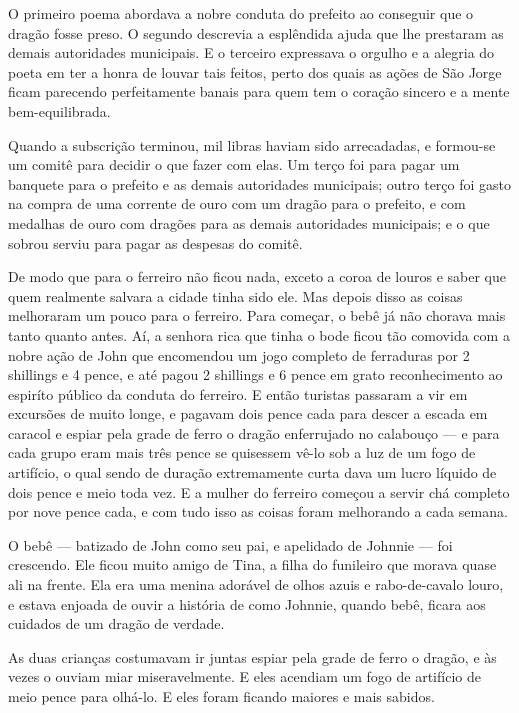 O primeiro poema abordava a nobre conduta do prefeito ao conseguir que
o dragão fosse preso. O segundo descrevia a esplêndida ajuda que lhe
prestaram as demais autoridades municipais. E o terceiro expressava o
orgulho e a alegria do poeta em ter a honra de louvar tais feitos,
perto dos quais as ações de São Jorge ficam parecendo perfeitamente
banais para quem tem o coração sincero e a mente bem-equilibrada.

Quando a subscrição terminou, mil libras haviam sido arrecadadas, e
formou-se um comitê para decidir o que fazer com elas. Um terço foi
para pagar um banquete para o prefeito e as demais autoridades
municipais; outro terço foi gasto na compra de uma corrente de ouro
com um dragão para o prefeito, e com medalhas de ouro com dragões
para as demais autoridades municipais; e o que sobrou serviu para
pagar as despesas do comitê.

De modo que para o ferreiro não ficou nada, exceto a coroa de louros e
saber que quem realmente salvara a cidade tinha sido ele. Mas depois
disso as coisas melhoraram um pouco para o ferreiro. Para começar, o
bebê já não chorava mais tanto quanto antes. Aí, a senhora rica que
tinha o bode ficou tão comovida com a nobre ação de John que
encomendou um jogo completo de ferraduras por 2 shillings e 4 pence,
e até pagou 2 shillings e 6 pence em grato reconhecimento ao espiríto
público da conduta do ferreiro. E então turistas passaram a vir em
excursões de muito longe, e pagavam dois pence cada para descer a
escada em caracol e espiar pela grade de ferro o dragão enferrujado
no calabouço — e para cada grupo eram mais três pence se quisessem
vê-lo sob a luz de um fogo de artifício, o qual sendo de duração
extremamente curta dava um lucro líquido de dois pence e meio toda
vez. E a mulher do ferreiro começou a servir chá completo por nove
pence cada, e com tudo isso as coisas foram melhorando a cada semana.

O bebê — batizado de John como seu pai, e apelidado de Johnnie — foi
crescendo. Ele ficou muito amigo de Tina, a filha do funileiro que
morava quase ali na frente. Ela era uma menina adorável de olhos
azuis e rabo-de-cavalo louro, e estava enjoada de ouvir a história de
como Johnnie, quando bebê, ficara aos cuidados de um dragão de
verdade.

As duas crianças costumavam ir juntas espiar pela grade de ferro o
dragão, e às vezes o ouviam miar miseravelmente. E eles acendiam um
fogo de artifício de meio pence para olhá-lo. E eles foram ficando
maiores e mais sabidos.

